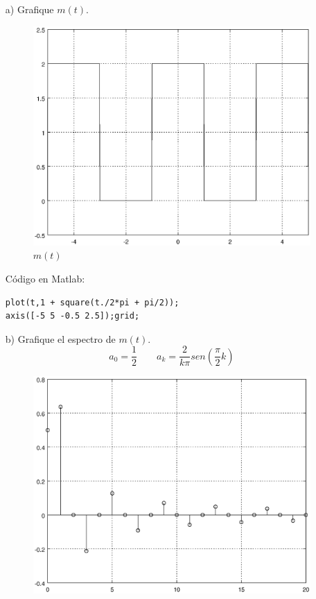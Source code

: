 \documentclass[a4paper,12pt]{article}
\begin{document}
\begin{itemize}
    \item[a)] Grafique $m(t)$.
    \begin{figure}[H]
        \begin{center}
            \includegraphics[width = 0.7\linewidth]{mt.eps}
            \caption{$m(t)$}
            \label{fig:mt}
        \end{center}
    \end{figure}
    Código en Matlab:
    \begin{lstlisting}
plot(t,1 + square(t./2*pi + pi/2));
axis([-5 5 -0.5 2.5]);grid;
    \end{lstlisting}
    \item[b)] Grafique el espectro de $m(t)$.
    \[ a_0 = \frac{1}{2} \qquad a_k = \frac{2}{k\pi}sen\left(\frac{\pi}{2}k\right) \]
\begin{multicols}{2}
    \begin{figure}[H]
        \begin{center}
            \includegraphics[width=\linewidth]{ak2}

\end{center}
\end{figure}
\end{multicols}
\end{itemize}
\end{document}
